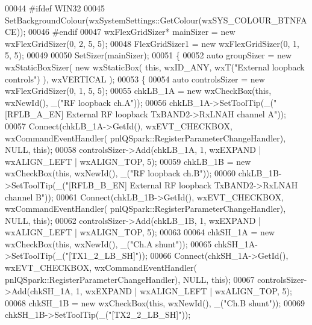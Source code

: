 \begin{DoxyCode}
00044 \textcolor{preprocessor}{#ifdef WIN32}
00045     SetBackgroundColour(wxSystemSettings::GetColour(wxSYS\_COLOUR\_BTNFACE));
00046 \textcolor{preprocessor}{#endif}
00047     wxFlexGridSizer* mainSizer = \textcolor{keyword}{new} wxFlexGridSizer(0, 2, 5, 5);
00048     FlexGridSizer1 = \textcolor{keyword}{new} wxFlexGridSizer(0, 1, 5, 5);
00049 
00050     SetSizer(mainSizer);
00051     \{
00052         \textcolor{keyword}{auto} groupSizer = \textcolor{keyword}{new} wxStaticBoxSizer( \textcolor{keyword}{new} wxStaticBox( \textcolor{keyword}{this}, wxID\_ANY, wxT(\textcolor{stringliteral}{"External loopback
       controls"}) ), wxVERTICAL );
00053         \{
00054             \textcolor{keyword}{auto} controlsSizer = \textcolor{keyword}{new} wxFlexGridSizer(0, 1, 5, 5);
00055             chkLB_1A = \textcolor{keyword}{new} wxCheckBox(\textcolor{keyword}{this}, wxNewId(), \_(\textcolor{stringliteral}{"RF loopback ch.A"}));
00056             chkLB_1A->SetToolTip(\_(\textcolor{stringliteral}{"[RFLB\_A\_EN] External RF loopback TxBAND2->RxLNAH channel A"}));
00057             Connect(chkLB_1A->GetId(), wxEVT\_CHECKBOX, wxCommandEventHandler(
      pnlQSpark::RegisterParameterChangeHandler), NULL, \textcolor{keyword}{this});
00058             controlsSizer->Add(chkLB_1A, 1, wxEXPAND | wxALIGN\_LEFT | wxALIGN\_TOP, 5);
00059             chkLB_1B = \textcolor{keyword}{new} wxCheckBox(\textcolor{keyword}{this}, wxNewId(), \_(\textcolor{stringliteral}{"RF loopback ch.B"}));
00060             chkLB_1B->SetToolTip(\_(\textcolor{stringliteral}{"[RFLB\_B\_EN] External RF loopback TxBAND2->RxLNAH channel B"}));
00061             Connect(chkLB_1B->GetId(), wxEVT\_CHECKBOX, wxCommandEventHandler(
      pnlQSpark::RegisterParameterChangeHandler), NULL, \textcolor{keyword}{this});
00062             controlsSizer->Add(chkLB_1B, 1, wxEXPAND | wxALIGN\_LEFT | wxALIGN\_TOP, 5);
00063 
00064             chkSH_1A = \textcolor{keyword}{new} wxCheckBox(\textcolor{keyword}{this}, wxNewId(), \_(\textcolor{stringliteral}{"Ch.A shunt"}));
00065             chkSH_1A->SetToolTip(\_(\textcolor{stringliteral}{"[TX1\_2\_LB\_SH]"}));
00066             Connect(chkSH_1A->GetId(), wxEVT\_CHECKBOX, wxCommandEventHandler(
      pnlQSpark::RegisterParameterChangeHandler), NULL, \textcolor{keyword}{this});
00067             controlsSizer->Add(chkSH_1A, 1, wxEXPAND | wxALIGN\_LEFT | wxALIGN\_TOP, 5);
00068             chkSH_1B = \textcolor{keyword}{new} wxCheckBox(\textcolor{keyword}{this}, wxNewId(), \_(\textcolor{stringliteral}{"Ch.B shunt"}));
00069             chkSH_1B->SetToolTip(\_(\textcolor{stringliteral}{"[TX2\_2\_LB\_SH]"}));

\end{DoxyCode}
